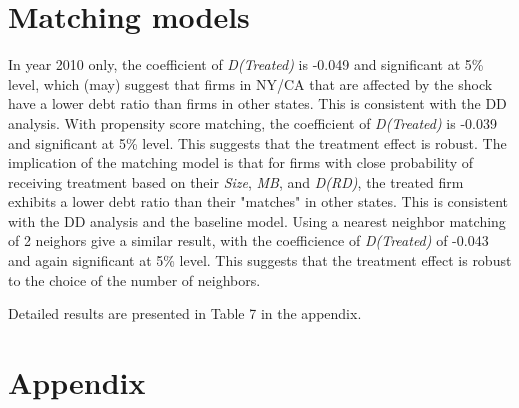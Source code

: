 \documentclass{article}
\begin{document}
\section*{Matching models}
In year 2010 only, the coefficient of \textit{D(Treated)} is -0.049 and significant at 5\% level, which (may) suggest that
firms in NY/CA that are affected by the shock have a lower debt ratio than firms in other states.
This is consistent with the DD analysis.
With propensity score matching, the coefficient of \textit{D(Treated)} is -0.039 and significant at 5\% level.
This suggests that the treatment effect is robust. The implication of the matching model is that for firms with close probability
of receiving treatment based on their \textit{Size}, \textit{MB}, and \textit{D(RD)}, the treated firm exhibits a lower debt ratio
than their "matches" in other states. This is consistent with the DD analysis and the baseline model.
Using a nearest neighbor matching of 2 neighors give a similar result, with the coefficience of \textit{D(Treated)} of -0.043
and again significant at 5\% level. This suggests that the treatment effect is robust to the choice of the number of neighbors.

Detailed results are presented in Table 7 in the appendix.

\section*{Appendix}
\end{document}

